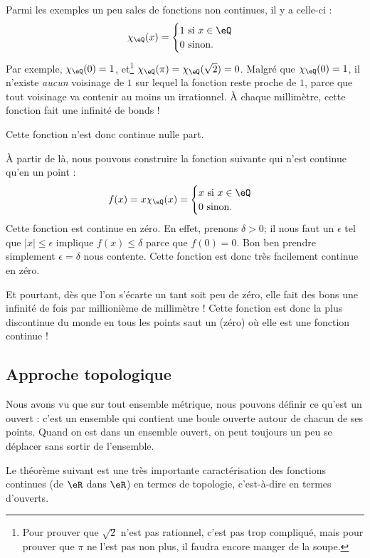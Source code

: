 Parmi les exemples un peu sales de fonctions non continues, il y a celle-ci :
\[
  \chi_{\eQ}(x)=
\begin{cases}
    1 \text{ si }x\in\eQ\\
    0 \text{ sinon.}
\end{cases}
\]
Par exemple, $\chi_{\eQ}(0)=1$, et\footnote{Pour prouver que $\sqrt{2}$ n'est pas rationnel, c'est pas trop compliqué, mais pour prouver que $\pi$ ne l'est pas non plus, il faudra encore manger de la soupe.} $\chi_{\eQ}(\pi)=\chi_{\eQ}(\sqrt{2})=0$. Malgré que $\chi_{\eQ}(0)=1$, il n'existe \emph{aucun} voisinage de $1$ sur lequel la fonction reste proche de $1$, parce que tout voisinage va contenir au moins un irrationnel. À chaque millimètre, cette fonction fait une infinité de bonds !

Cette fonction n'est donc continue nulle part.

À partir de là, nous pouvons construire la fonction suivante qui n'est continue qu'en un point :
\[
  f(x)=x\chi_{\eQ}(x)=
\begin{cases}
x\text{ si }x\in\eQ\\
0\text{ sinon.}
\end{cases}
\]
Cette fonction est continue en zéro. En effet, prenons $\delta>0$; il nous faut un $\epsilon$ tel que $| x |\leq\epsilon$ implique $f(x)\leq \delta$ parce que $f(0)=0$. Bon ben prendre simplement $\epsilon=\delta$ nous contente. Cette fonction est donc très facilement continue en zéro.

Et pourtant, dès que l'on s'écarte un tant soit peu de zéro, elle fait des bons une infinité de fois par millionième de millimètre ! Cette fonction est donc la plus discontinue du monde en tous les points saut un (zéro) où elle est une fonction continue !

\subsection{Approche topologique}

Nous avons vu que sur tout ensemble métrique, nous pouvons définir ce qu'est un ouvert : c'est un ensemble qui contient une boule ouverte autour de chacun de ses points. Quand on est dans un ensemble ouvert, on peut toujours un peu se déplacer sans sortir de l'ensemble.

Le théorème suivant est une très importante caractérisation des fonctions continues (de $\eR$ dans $\eR$) en termes de topologie, c'est-à-dire en termes d'ouverts.


